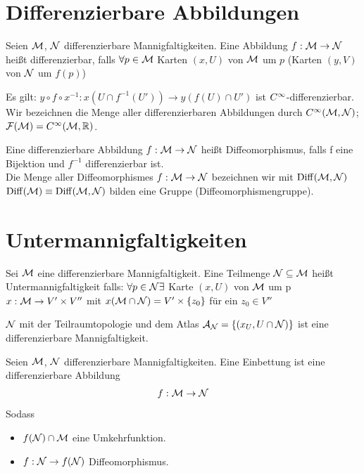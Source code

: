 \section{Differenzierbare Abbildungen}
\begin{defs}
Seien $\mathcal{M}$, $\mathcal{N}$ differenzierbare Mannigfaltigkeiten. 
Eine Abbildung $f: \mathcal{M} \to \mathcal{N}$ heißt differenzierbar, falls $\forall p \in \mathcal{M}$ Karten $(x, U)$ von $\mathcal{M}$ um $p$ (Karten $(y, V)$ von $\mathcal{N}$ um $f(p)$)
\end{defs}
Es gilt: $y \circ f \circ x^{-1}: x(U \cap f^{-1} (U')) \to y(f(U) \cap U')$ ist $C^\infty$-differenzierbar.
Wir bezeichnen die Menge aller differenzierbaren Abbildungen durch $C^\infty(\mathcal{M}, \mathcal{N})$; $\mathcal{F}(\mathcal{M}) = C^\infty(\mathcal{M}, \mathbb{R})$.

\begin{defs}[Diffeomorphismus]
Eine differenzierbare Abbildung $f: \mathcal{M} \to \mathcal{N}$ heißt Diffeomorphismus, falls f eine Bijektion und $f^{-1}$ differenzierbar ist. \\
Die Menge aller Diffeomorphismes $f: \mathcal{M} \to \mathcal{N}$ bezeichnen wir mit $\operatorname{Diff}(\mathcal{M}, \mathcal{N})$
$\operatorname{Diff}(\mathcal{M}) \equiv \operatorname{Diff}(\mathcal{M}, \mathcal{N})$ bilden eine Gruppe (Diffeomorphismengruppe).
\end{defs}


\section{Untermannigfaltigkeiten}

\begin{defs}[Untermannigfaltigkeiten]
Sei $\mathcal{M}$ eine differenzierbare Mannigfaltigkeit. 
Eine Teilmenge $\mathcal{N} \subseteq \mathcal{M}$ heißt Untermannigfaltigkeit falls:
$\forall p \in \mathcal{N} \exists$ Karte $(x, U)$ von $\mathcal{M}$ um p $x: \mathcal{M} \to V' \times V''$ mit $x(\mathcal{M} \cap \mathcal{N}) = V' \times \{z_0 \}$
für ein $z_0 \in V''$
\end{defs}


\begin{bem}
$\mathcal{N}$ mit der Teilraumtopologie und dem Atlas $\mathcal{A}_{\mathcal{N}} = \{ (x_U, U \cap \mathcal{N} ) \}$ ist eine differenzierbare Mannigfaltigkeit.
\end{bem}

\begin{defs}[Einbettung]
Seien $\mathcal{M}$, $\mathcal{N}$ differenzierbare Mannigfaltigkeiten. 
Eine Einbettung ist eine differenzierbare Abbildung
\begin{align}
f: \mathcal{M} \to \mathcal{N} 
\end{align}
Sodass
\begin{itemize}
\item $f(\mathcal{N}) \cap \mathcal{M}$ eine Umkehrfunktion.
\item $f: \mathcal{N} \to f(\mathcal{N})$ Diffeomorphismus.
\end{itemize}
\end{defs}


